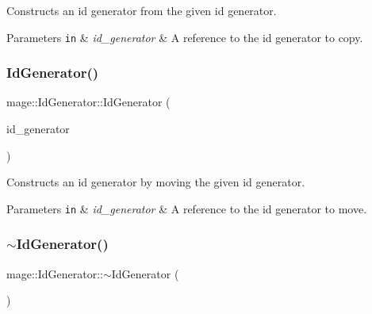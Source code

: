 Constructs an id generator from the given id generator.


\begin{DoxyParams}[1]{Parameters}
\mbox{\tt in}  & {\em id\+\_\+generator} & A reference to the id generator to copy. \\
\hline
\end{DoxyParams}
\hypertarget{structmage_1_1_id_generator_a0ee69053c6cdb9f79a5857e65ebd2b6a}{}\label{structmage_1_1_id_generator_a0ee69053c6cdb9f79a5857e65ebd2b6a} 
\subsubsection{\texorpdfstring{Id\+Generator()}{IdGenerator()}\hspace{0.1cm}{\footnotesize\ttfamily [3/3]}}
{\footnotesize\ttfamily mage\+::\+Id\+Generator\+::\+Id\+Generator (\begin{DoxyParamCaption}\item[{\hyperlink{structmage_1_1_id_generator}{Id\+Generator} \&\&}]{id\+\_\+generator }\end{DoxyParamCaption})\hspace{0.3cm}{\ttfamily [default]}}

Constructs an id generator by moving the given id generator.


\begin{DoxyParams}[1]{Parameters}
\mbox{\tt in}  & {\em id\+\_\+generator} & A reference to the id generator to move. \\
\hline
\end{DoxyParams}
\hypertarget{structmage_1_1_id_generator_a70161ab5b10294ebba1ace7a3b0f8d31}{}\label{structmage_1_1_id_generator_a70161ab5b10294ebba1ace7a3b0f8d31} 
\subsubsection{\texorpdfstring{$\sim$\+Id\+Generator()}{~IdGenerator()}}
{\footnotesize\ttfamily mage\+::\+Id\+Generator\+::$\sim$\+Id\+Generator (\begin{DoxyParamCaption}{ }\end{DoxyParamCaption})\hspace{0.3cm}{\ttfamily [default]}}

